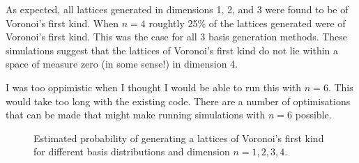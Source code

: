 \documentclass[a4paper,10pt]{article}
\begin{document}
As expected, all lattices generated in dimensions 1, 2, and 3 were found to be of Voronoi's first kind.  When $n=4$ roughtly 25\% of the lattices generated were of Voronoi's first kind. This was the case for all 3 basis generation methods.  These simulations suggest that the lattices of Voronoi's first kind do not lie within a space of measure zero (in some sense!) in dimension 4.

I was too oppimistic when I thought I would be able to run this with $n=6$.  This would take too long with the existing code.  There are a number of optimisations that can be made that might make running simulations with $n=6$ possible.

\begin{figure}[tp]
\centering 
\caption{Estimated probability of generating a lattices of Voronoi's first kind for different basis distributions and dimension $n=1,2,3,4$.}
\end{figure}




 
%
\end{document}
